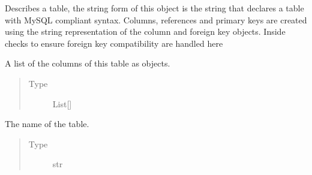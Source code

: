 \documentclass[letterpaper,10pt,english]{sphinxmanual}
\begin{document}
\begin{fulllineitems}
\label{\detokenize{model:simple_sql.model.table.Table}}
\sphinxAtStartPar
Describes a table, the string form of this object is the
string that declares a table with MySQL compliant syntax.
Columns, references and primary keys are created using the
string representation of the column and foreign key objects.
Inside checks to ensure foreign key compatibility are handled
here

\begin{fulllineitems}
\label{\detokenize{model:simple_sql.model.table.Table.__columns}}
\sphinxAtStartPar
A list of the columns of this table as objects.
\begin{quote}\begin{description}
\item[{Type}] \leavevmode
\sphinxAtStartPar
List{[}{\hyperref[\detokenize{model:simple_sql.model.column.Column}]{}}{]}

\end{description}\end{quote}

\end{fulllineitems}


\begin{fulllineitems}
\label{\detokenize{model:simple_sql.model.table.Table.__name}}
\sphinxAtStartPar
The name of the table.
\begin{quote}\begin{description}
\item[{Type}] \leavevmode
\sphinxAtStartPar
str

\end{description}\end{quote}


\end{fulllineitems}
\end{fulllineitems}
\end{document}
